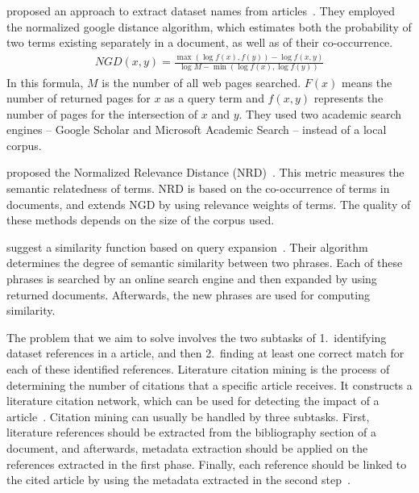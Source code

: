 \documentclass{IOS-Book-Article}
\begin{document}
\citeauthor{sighal2013} proposed an approach to extract dataset names from articles~\citeyearpar{sighal2013}.
They employed the normalized google distance algorithm, which estimates both the probability of two terms existing separately in a document, as well as of their co-occurrence. 
\begin{align*}
	\mathit{NGD}(x,y)=\frac{\max(\log f(x),f(y))-\log f(x,y)}{\log M -\min(\log f(x),\log f(y))}
\end{align*}
In this formula, $M$ is the number of all web pages searched.
$F(x)$ means the number of returned pages for $x$ as a query term and $f(x,y)$ represents the number of pages for the intersection of $x$ and $y$. 
They used two academic search engines -- Google Scholar and Microsoft Academic Search -- instead of a local corpus.

\citeauthor{Schaefer2014} proposed the Normalized Relevance Distance (NRD)~\citeyearpar{Schaefer2014}.
This metric measures the semantic relatedness of terms.
NRD is based on the co-occurrence of terms in documents, and extends NGD by using relevance weights of terms.
The quality of these methods depends on the size of the corpus used.

\citeauthor{Sahami2006} suggest a similarity function based on query expansion~\citeyearpar{Sahami2006}.
Their algorithm determines the degree of semantic similarity between two phrases.
Each of these phrases is searched by an online search engine and then expanded by using returned documents.
Afterwards, the new phrases are used for computing similarity. 

The problem that we aim to solve involves the two subtasks of 1.\ identifying dataset references in a article, and then 2.\ finding at least one correct match for each of these identified references.
Literature citation mining is the process of determining the number of citations that a specific article receives.
It constructs a literature citation network, which can be used for detecting the impact of a article~\cite{Afzal2010}.
Citation mining can usually be handled by three subtasks.
First, literature references should be extracted from the bibliography section of a document, and afterwards, metadata extraction should be applied on the references extracted in the first phase.
Finally, each reference should be linked to the cited article by using the metadata extracted in the second step~\cite{Afzal2010}.
\end{document}
